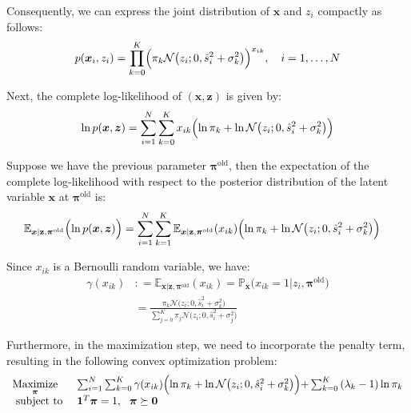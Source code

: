 \documentclass[11pt]{article}
\begin{document}
Consequently, we can express the joint distribution of $\boldsymbol{x}$ and $z_i$ compactly as follows:
$$
p(\boldsymbol{x}_i, z_i) = \prod_{k=0}^K \Bigl( \pi_k \mathcal{N} \bigl(z_i; 0, \hat{s}_i^2+\sigma_k^2 \bigl) \Bigl)^{x_{ik}}, \quad i = 1, \ldots, N
$$


Next, the complete log-likelihood of $(\boldsymbol{x}, \boldsymbol{z})$ is given by:
$$
\ln p(\boldsymbol{x}, \boldsymbol{z}) = \sum_{i=1}^N \sum_{k=0}^K x_{ik} \Bigl( \ln{\pi_k} + \ln \mathcal{N} \bigl(z_i; 0, \hat{s}_i^2+\sigma_k^2 \bigl) \Bigl)
$$

Suppose we have the previous parameter $\boldsymbol{\pi}^{\text{old}}$, then the expectation of the complete log-likelihood with respect to the posterior distribution of the latent variable $\boldsymbol{x}$ at $\boldsymbol{\pi}^{\text{old}}$ is:
$$
\begin{aligned}
& \mathbb{E}_{\boldsymbol{x} \vert \mathbf{z}, \boldsymbol{\pi}^{\text{old}}} \Bigl( \ln p(\boldsymbol{x}, \boldsymbol{z}) \Big) = \sum_{i=1}^N \sum_{k=1}^K \mathbb{E}_{\boldsymbol{x} \vert \mathbf{z}, \boldsymbol{\pi}^{\text{old}}}(x_{ik}) \Bigl( \ln{\pi_k} + \ln \mathcal{N} \bigl(z_i; 0, \hat{s}_i^2+\sigma_k^2 \bigl) \Bigl)
\end{aligned}
$$


Since $x_{ik}$ is a Bernoulli random variable, we have:
$$
\begin{aligned}
\gamma(x_{ik}) & : = \mathbb{E}_{\boldsymbol{x} \vert \mathbf{z}, \boldsymbol{\pi}^{\text{old}}}(x_{ik}) = \mathbb{P}_{\boldsymbol{x}} \bigl(x_{ik} = 1 \vert z_i, \boldsymbol{\pi}^{\text{old}} \bigl)  \\ 
& = \frac{\pi_k \mathcal{N} \bigl(z_i; 0, \hat{s}_i^2+\sigma_k^2 \bigl)}{\sum_{j=0}^K \pi_j \mathcal{N} \bigl(z_i; 0, \hat{s}_i^2+\sigma_j^2 \bigl)}
\end{aligned}
$$


Furthermore, in the maximization step, we need to incorporate the penalty term, resulting in the following convex optimization problem:
$$
\begin{array}{ll}
\underset{\boldsymbol{\pi}}{\operatorname{Maximize}} &  \sum_{i=1}^N \sum_{k=0}^K \gamma(x_{ik}) \Bigl(  \ln{\pi_k} + \ln \mathcal{N} \bigl(z_i; 0, \hat{s}_i^2+\sigma_k^2 \bigl) \Bigl) + \sum_{k=0}^K\left(\lambda_k-1\right) \ln \pi_k \\
\text { subject to } &  \mathbf{1}^T \boldsymbol{\pi} = 1, \ \  \boldsymbol{\pi} \succeq \mathbf{0}
\end{array}
$$
\end{document}
